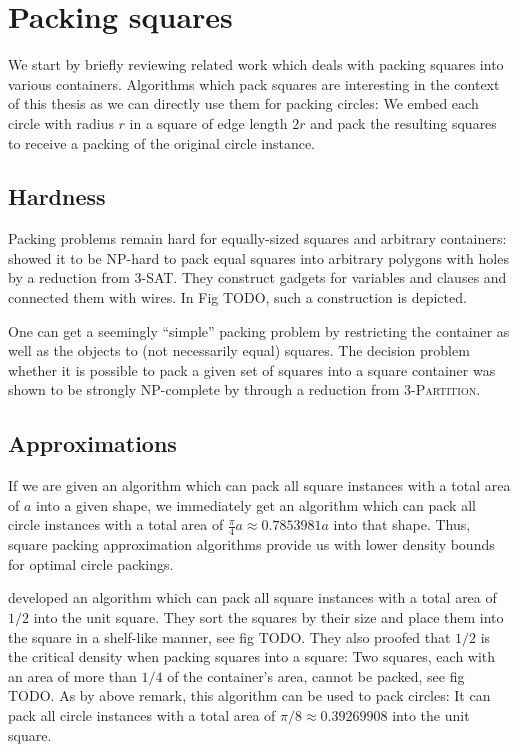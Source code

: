 \documentclass[a4paper,style=print,bibliography=totoc,nexus,lnum,extramargin]{tubsbook}
\begin{document}
\section{Packing squares}

We start by briefly reviewing related work which deals with packing squares into various containers.
Algorithms which pack squares are interesting in the context of this thesis as we can directly use them for packing circles: We embed each circle with radius $r$ in a square of edge length $2r$ and pack the resulting squares to receive a packing of the original circle instance.

\subsection{Hardness}

Packing problems remain hard for equally-sized squares and arbitrary containers: \textcite{FPT1981optimal} showed it to be NP-hard to pack equal squares into arbitrary polygons with holes by a reduction from \textsc{3-SAT}. They construct gadgets for variables and clauses and connected them with wires. In Fig TODO, such a construction is depicted.

One can get a seemingly “simple” packing problem by restricting the container as well as the objects to (not necessarily equal) squares.
The decision problem whether it is possible to pack a given set of squares into a square container was shown to be strongly NP-complete by \textcite{LTWYC1990packing} through a reduction from \textsc{3-Partition}.

\subsection{Approximations}

If we are given an algorithm which can pack all square instances with a total area of $a$ into a given shape, we immediately get an algorithm which can pack all circle instances with a total area of $\frac{\pi}{4}a \approx 0.7853981a$ into that shape. Thus, square packing approximation algorithms provide us with lower density bounds for optimal circle packings.

\textcite{MM1967some} developed an algorithm which can pack all square instances with a total area of $1/2$ into the unit square.
They sort the squares by their size and place them into the square in a shelf-like manner, see fig TODO.
They also proofed that $1/2$ is the critical density when packing squares into a square: Two squares, each with an area of more than $1/4$ of the container's area, cannot be packed, see fig TODO.
As by above remark, this algorithm can be used to pack circles: It can pack all circle instances with a total area of $\pi/8 \approx 0.39269908$ into the unit square.
\end{document}
